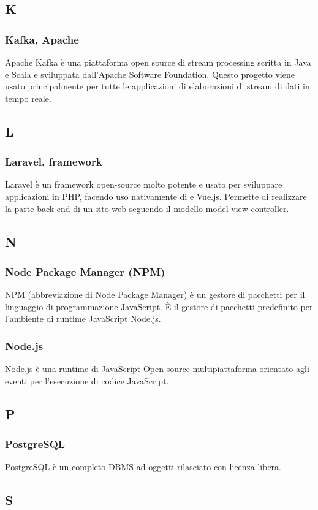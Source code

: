 \subsection{K}
\subsubsection*{Kafka, Apache}  Apache Kafka è una piattaforma open source di stream processing scritta in Java e Scala e sviluppata dall'Apache Software Foundation.  Questo progetto viene usato principalmente per tutte le applicazioni di elaborazioni di stream di dati in tempo reale.
\subsection{L}
\subsubsection*{Laravel, framework}  Laravel è un framework open-source molto potente e usato per sviluppare applicazioni in PHP, facendo uso nativamente di  e Vue.js. Permette di realizzare la parte back-end di un sito web seguendo il modello model-view-controller. 
\subsection{N}
\subsubsection*{Node Package Manager (NPM)}  NPM (abbreviazione di Node Package Manager) è un gestore di pacchetti per il linguaggio di programmazione JavaScript. È il gestore di pacchetti predefinito per l'ambiente di runtime JavaScript Node.js.
\subsubsection*{Node.js}  Node.js è una runtime di JavaScript Open source multipiattaforma orientato agli eventi per l'esecuzione di codice JavaScript.
\subsection{P}
\subsubsection*{PostgreSQL}  PostgreSQL è un completo DBMS ad oggetti rilasciato con licenza libera.
\subsection{S}
